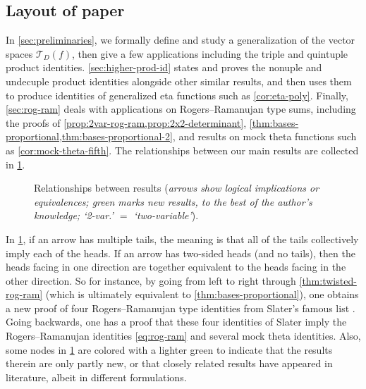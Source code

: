 \documentclass[reqno,11pt]{amsart}
\theoremstyle{definition}
\theoremstyle{remark}
\numberwithin{equation}{section}
\newcommand{\mT}{\mathcal{T}}
\begin{document}
\subsection{Layout of paper} 
In \cref{sec:preliminaries}, we formally define and study a generalization of the vector spaces $\mT_D(f)$, then give a few applications including the triple and quintuple product identities. %
\cref{sec:higher-prod-id} states and proves the nonuple and undecuple product identities alongside other similar results,
and then uses them to produce identities of generalized eta functions such as \cref{cor:eta-poly}. Finally, \cref{sec:rog-ram} deals with applications on Rogers--Ramanujan type sums, including the proofs of \cref{prop:2var-rog-ram,prop:2x2-determinant}, \cref{thm:bases-proportional,thm:bases-proportional-2}, and results on mock theta functions such as \cref{cor:mock-theta-fifth}. The relationships between our main results are collected in \cref{fig:layout}.

\begin{figure}[ht] 
\begin{figure}[omitted: a diagram of this paper's results, not reproduced here]\end{figure}
\caption{Relationships between results (\emph{arrows show logical implications or equivalences; green marks new results, to the best of the author's knowledge; `2-var.' $=$ `two-variable'}).}
\label{fig:layout}
\end{figure}
\FloatBarrier%

In \cref{fig:layout}, if an arrow has multiple tails, the meaning is that all of the tails collectively imply each of the heads. If an arrow has two-sided heads (and no tails), then the heads facing in one direction are together equivalent to the heads facing in the other direction. So for instance, by going from left to right through \cref{thm:twisted-rog-ram} (which is ultimately equivalent to \cref{thm:bases-proportional}), one obtains a new proof of four Rogers--Ramanujan type identities from Slater's famous list \cite[(94),(96),(98),(99)]{slater1952further}. Going backwards, one has a proof that these four identities of Slater imply the Rogers--Ramanujan identities \cref{eq:rog-ram} and several mock theta identities. Also, some nodes in \cref{fig:layout} are colored with a lighter green to indicate that the results therein are only partly new, or that closely related results have appeared in literature, albeit in different formulations.
\end{document}
